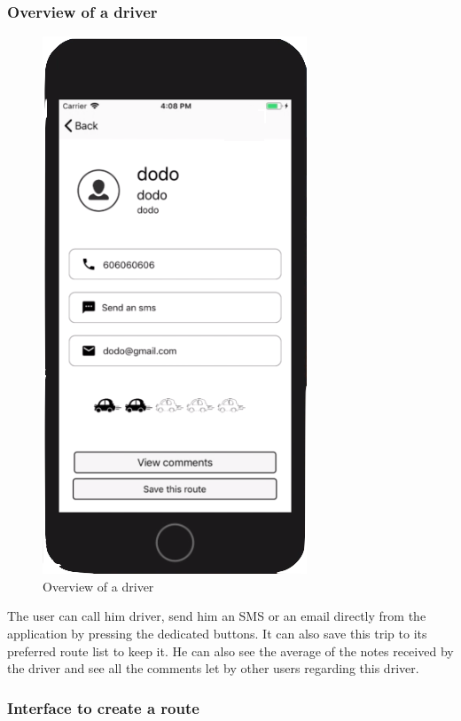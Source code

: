 \subsubsection{Overview of a driver}

\begin{figure}[h!]
\begin{center}
\includegraphics[scale = 0.3]{diagrams/OverviewDriver.png} 
\end{center}
\caption{Overview of a driver}
\end{figure}

The user can call him driver, send him an SMS or an email directly from the application by pressing the dedicated buttons. It can also save this trip to its preferred route list to keep it. He can also see the average of the notes received by the driver and see all the comments let by other users regarding this driver.

\subsubsection{Interface to create a route}


